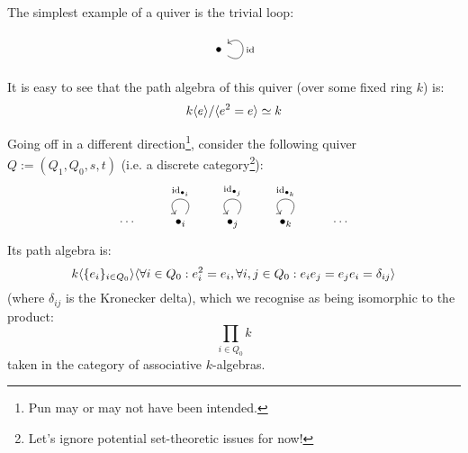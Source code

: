             \begin{example}
                The simplest example of a quiver is the trivial loop:
                    $$
                        \begin{tikzcd}
                            \bullet \arrow["\id"', loop, distance=2em, in=35, out=325]
                        \end{tikzcd}
                    $$
                It is easy to see that the path algebra of this quiver (over some fixed ring $k$) is:
                    $$k\langle e\rangle/\langle e^2 = e\rangle \simeq k$$
                    
                Going off in a different direction\footnote{Pun may or may not have been intended.}, consider the following quiver $Q := (Q_1, Q_0, s, t)$ (i.e. a discrete category\footnote{Let's ignore potential set-theoretic issues for now!}):
                    $$
                        \begin{tikzcd}
                            \cdots & \bullet_i \arrow["\id_{\bullet_i}"', loop, distance=2em, in=125, out=55] & \bullet_j \arrow["\id_{\bullet_j}"', loop, distance=2em, in=125, out=55] & \bullet_k \arrow["\id_{\bullet_k}"', loop, distance=2em, in=125, out=55] & \cdots
                        \end{tikzcd}
                    $$
                Its path algebra is:
                    $$k\langle\{e_i\}_{i \in Q_0}\rangle\/\langle\forall i \in Q_0: e_i^2 = e_i, \forall i, j \in Q_0: e_i e_j = e_j e_i = \delta_{ij}\rangle$$
                (where $\delta_{ij}$ is the Kronecker delta), which we recognise as being isomorphic to the product:
                    $$\prod_{i \in Q_0} k$$
                taken in the category of associative $k$-algebras.
            \end{example}
